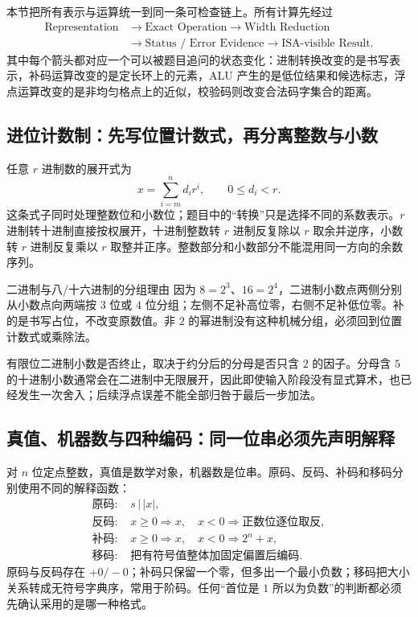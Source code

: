 \documentclass[UTF8,fontset=fandol,11pt,a4paper]{ctexart}
\begin{document}
本节把所有表示与运算统一到同一条可检查链上。所有计算先经过
\[
\begin{aligned}
\text{Representation}&\to\text{Exact Operation}\to\text{Width Reduction}\\
&\to\text{Status / Error Evidence}\to\text{ISA-visible Result}.
\end{aligned}
\]
其中每个箭头都对应一个可以被题目追问的状态变化：进制转换改变的是书写表示，补码运算改变的是定长环上的元素，ALU 产生的是低位结果和候选标志，浮点运算改变的是非均匀格点上的近似，校验码则改变合法码字集合的距离。

\subsection{进位计数制：先写位置计数式，再分离整数与小数}

任意 $r$ 进制数的展开式为
\[
x=\sum_{i=m}^{n}d_i r^i,\qquad 0\le d_i<r.
\]
这条式子同时处理整数位和小数位；题目中的“转换”只是选择不同的系数表示。$r$ 进制转十进制直接按权展开，十进制整数转 $r$ 进制反复除以 $r$ 取余并逆序，小数转 $r$ 进制反复乘以 $r$ 取整并正序。整数部分和小数部分不能混用同一方向的余数序列。

\begin{methodbox}{二进制与八/十六进制的分组理由}
因为 $8=2^3$、$16=2^4$，二进制小数点两侧分别从小数点向两端按 $3$ 位或 $4$ 位分组；左侧不足补高位零，右侧不足补低位零。补的是书写占位，不改变原数值。非 $2$ 的幂进制没有这种机械分组，必须回到位置计数式或乘除法。
\end{methodbox}

有限位二进制小数是否终止，取决于约分后的分母是否只含 $2$ 的因子。分母含 $5$ 的十进制小数通常会在二进制中无限展开，因此即使输入阶段没有显式算术，也已经发生一次舍入；后续浮点误差不能全部归咎于最后一步加法。

\subsection{真值、机器数与四种编码：同一位串必须先声明解释}

对 $n$ 位定点整数，真值是数学对象，机器数是位串。原码、反码、补码和移码分别使用不同的解释函数：
\[
\begin{aligned}
\text{原码: }&s\,|\,|x|,\\
\text{反码: }&x\ge0\Rightarrow x,\quad x<0\Rightarrow \text{正数位逐位取反},\\
\text{补码: }&x\ge0\Rightarrow x,\quad x<0\Rightarrow 2^n+x,\\
\text{移码: }&\text{把有符号值整体加固定偏置后编码}.
\end{aligned}
\]
原码与反码存在 $+0/-0$；补码只保留一个零，但多出一个最小负数；移码把大小关系转成无符号字典序，常用于阶码。任何“首位是 $1$ 所以为负数”的判断都必须先确认采用的是哪一种格式。
\end{document}
